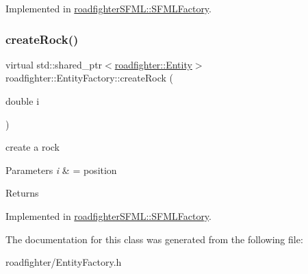 Implemented in \hyperlink{classroadfighterSFML_1_1SFMLFactory_acb966ae41ef0a928c4adc34b4c97cedb}{roadfighter\+S\+F\+M\+L\+::\+S\+F\+M\+L\+Factory}.

\mbox{\label{classroadfighter_1_1EntityFactory_a3bcb7e8b8ca62628c842962cfbba50be}} 
\subsubsection{\texorpdfstring{create\+Rock()}{createRock()}}
{\footnotesize\ttfamily virtual std\+::shared\+\_\+ptr$<$\hyperlink{classroadfighter_1_1Entity}{roadfighter\+::\+Entity}$>$ roadfighter\+::\+Entity\+Factory\+::create\+Rock (\begin{DoxyParamCaption}\item[{double}]{i }\end{DoxyParamCaption})\hspace{0.3cm}{\ttfamily [pure virtual]}}

create a rock 
\begin{DoxyParams}{Parameters}
{\em i} & = position \\
\hline
\end{DoxyParams}
\begin{DoxyReturn}{Returns}

\end{DoxyReturn}


Implemented in \hyperlink{classroadfighterSFML_1_1SFMLFactory_ace05bdfcf9fc4f1ca7b9fc6f840b7a12}{roadfighter\+S\+F\+M\+L\+::\+S\+F\+M\+L\+Factory}.



The documentation for this class was generated from the following file\+:\begin{DoxyCompactItemize}
\item 
roadfighter/Entity\+Factory.\+h\end{DoxyCompactItemize}
